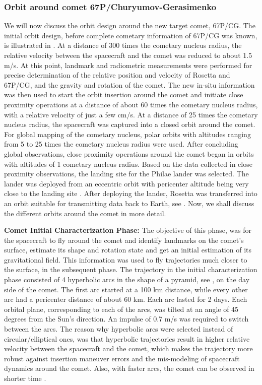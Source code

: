 \subsubsection{Orbit around comet 67P/Churyumov-Gerasimenko}
We will now discuss the orbit design around the new target comet, 67P/CG. The initial orbit design, before complete cometary information of 67P/CG was known, is illustrated in . At a distance of 300 times the cometary nucleus radius, the relative velocity between the spacecraft and the comet was reduced to about 1.5 m/s. At this point, landmark and radiometric measurements were performed for precise determination of the relative position and velocity of Rosetta and 67P/CG, and the gravity and rotation of the comet. The new in-situ information was then used to start the orbit insertion around the comet and initiate close proximity operations at a distance of about 60 times the cometary nucleus radius, with a relative velocity of just a few cm/s. At a distance of 25 times the cometary nucleus radius, the spacecraft was captured into a closed orbit around the comet. For global mapping of the cometary nucleus, polar orbits with altitudes ranging from 5 to 25 times the cometary nucleus radius were used. After concluding global observations, close proximity operations around the comet began in orbits with altitudes of 1 cometary nucleus radius. Based on the data collected in close proximity observations, the landing site for the Philae lander was selected. The lander was deployed from an eccentric orbit with pericenter altitude being very close to the landing site \cite{rosettanew2007}. After deploying the lander, Rosetta was transferred into an orbit suitable for transmitting data back to Earth, see . Now, we shall discuss the different orbits around the comet in more detail.

\textbf{Comet Initial Characterization Phase:} The objective of this phase, was for the spacecraft to fly around the comet and identify landmarks on the comet's surface, estimate its shape and rotation state and get an initial estimation of its gravitational field. This information was used to fly trajectories much closer to the surface, in the subsequent phase. The trajectory in the initial characterization phase consisted of 4 hyperbolic arcs in the shape of a pyramid, see , on the day side of the comet. The first arc started at a 100 km distance, while every other arc had a pericenter distance of about 60 km. Each arc lasted for 2 days. Each orbital plane, corresponding to each of the arcs, was tilted at an angle of 45 degrees from the Sun's direction. An impulse of 0.7 m/s was required to switch between the arcs. The reason why hyperbolic arcs were selected instead of circular/elliptical ones, was that hyperbolic trajectories result in higher relative velocity between the spacecraft and the comet, which makes the trajectory more robust against insertion maneuver errors and the mis-modeling of spacecraft dynamics around the comet. Also, with faster arcs, the comet can be observed in shorter time \cite{rosettanew2012}.

